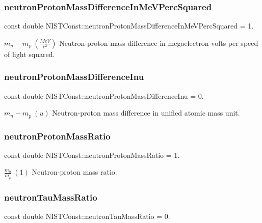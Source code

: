 \subsubsection{\texorpdfstring{neutron\+Proton\+Mass\+Difference\+In\+Me\+V\+Perc\+Squared}{neutronProtonMassDifferenceInMeVPercSquared}}
{\footnotesize\ttfamily const double N\+I\+S\+T\+Const\+::neutron\+Proton\+Mass\+Difference\+In\+Me\+V\+Perc\+Squared = 1.}

$m_n - m_p \ (\frac{MeV}{c^2})$ Neutron-\/proton mass difference in megaelectron volts per speed of light squared. \mbox{\label{group___neutron_ga570caff89957976a8486d25e5288df51}} 
\subsubsection{\texorpdfstring{neutron\+Proton\+Mass\+Difference\+Inu}{neutronProtonMassDifferenceInu}}
{\footnotesize\ttfamily const double N\+I\+S\+T\+Const\+::neutron\+Proton\+Mass\+Difference\+Inu = 0.}

$m_n - m_p \ (u)$ Neutron-\/proton mass difference in unified atomic mass unit. \mbox{\label{group___neutron_gad8a08222b3de2105b5b399faa5a59fbd}} 
\subsubsection{\texorpdfstring{neutron\+Proton\+Mass\+Ratio}{neutronProtonMassRatio}}
{\footnotesize\ttfamily const double N\+I\+S\+T\+Const\+::neutron\+Proton\+Mass\+Ratio = 1.}

$\frac{m_n}{m_p} \ (1)$ Neutron-\/proton mass ratio. \mbox{\label{group___neutron_ga9c3ba7b26cbcc0b2f7f7fa551812683a}} 
\subsubsection{\texorpdfstring{neutron\+Tau\+Mass\+Ratio}{neutronTauMassRatio}}
{\footnotesize\ttfamily const double N\+I\+S\+T\+Const\+::neutron\+Tau\+Mass\+Ratio = 0.}

